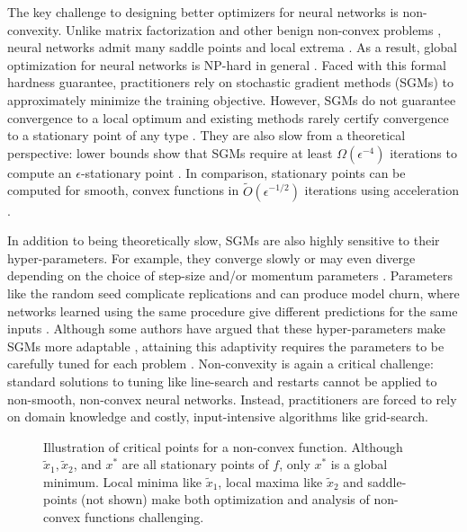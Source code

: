 The key challenge to designing better optimizers for neural networks is
non-convexity.
Unlike matrix factorization and other benign non-convex problems
\citep{burer2005low}, neural networks admit many saddle points and
local extrema \citep{safran2018local, dauphin2014saddles}.
As a result, global optimization for neural networks is NP-hard in general
\citep{froese2023hard, blum1988complete}.
Faced with this formal hardness guarantee, practitioners rely on stochastic
gradient methods (SGMs) to approximately minimize the training objective.
However, SGMs do not guarantee convergence to a local optimum \citep{ge2015escaping}
and existing methods rarely certify convergence to a stationary point of any
type \citep{goodfellow2016deeplearning}.
They are also slow from a theoretical perspective:
lower bounds show that SGMs require at least \( \Omega(\epsilon^{-4}) \) iterations
to compute an \( \epsilon \)-stationary point \citep{arjevani2023lower, drori2020complexity}.
In comparison, stationary points can be computed for smooth, convex functions
in \( \tilde{O}(\epsilon^{-1/2}) \) iterations using acceleration
\citep{nesterov2018lectures}.

In addition to being theoretically slow, SGMs are also highly sensitive to
their hyper-parameters.
For example, they converge slowly or may even diverge depending on the choice
of step-size and/or momentum parameters \citep{zhang2022adam}.
Parameters like the random seed complicate replications and can produce model
churn, where networks learned using the same procedure give different
predictions for the same inputs \citep{henderson2018deep,
    bhojanapalli2021reproducibility}.
Although some authors have argued that these hyper-parameters make
SGMs more adaptable \citep{choi2019empirical}, attaining this adaptivity
requires the parameters to be carefully tuned for each problem
\citep{sivaprasad2020tuning}.
Non-convexity is again a critical challenge:
standard solutions to tuning like line-search
\citep{armijo1966ls} and restarts \citep{odonoghue2015restarts} cannot be
applied to non-smooth, non-convex neural networks.
Instead, practitioners are forced to rely on domain knowledge and costly,
input-intensive algorithms like grid-search.

\begin{figure}[t]
    \centering
    
    \caption{Illustration of critical points for a non-convex function.
        Although \( \tilde{x}_1, \tilde{x}_2 \), and \( x^* \) are all
        stationary points of \( f \), only \( x^* \) is a global minimum.
        Local minima like \( \tilde{x}_1 \), local maxima like \( \tilde{x}_2 \)
        and saddle-points (not shown) make both optimization and analysis
        of non-convex functions challenging.
    }%
    \label{fig:non-convex}
\end{figure}

